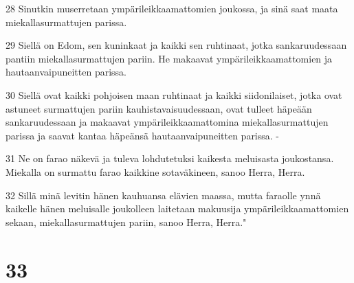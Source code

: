 \par 28 Sinutkin muserretaan ympärileikkaamattomien joukossa, ja sinä saat maata miekallasurmattujen parissa.
\par 29 Siellä on Edom, sen kuninkaat ja kaikki sen ruhtinaat, jotka sankaruudessaan pantiin miekallasurmattujen pariin. He makaavat ympärileikkaamattomien ja hautaanvaipuneitten parissa.
\par 30 Siellä ovat kaikki pohjoisen maan ruhtinaat ja kaikki siidonilaiset, jotka ovat astuneet surmattujen pariin kauhistavaisuudessaan, ovat tulleet häpeään sankaruudessaan ja makaavat ympärileikkaamattomina miekallasurmattujen parissa ja saavat kantaa häpeänsä hautaanvaipuneitten parissa. -
\par 31 Ne on farao näkevä ja tuleva lohdutetuksi kaikesta meluisasta joukostansa. Miekalla on surmattu farao kaikkine sotaväkineen, sanoo Herra, Herra.
\par 32 Sillä minä levitin hänen kauhuansa elävien maassa, mutta faraolle ynnä kaikelle hänen meluisalle joukolleen laitetaan makuusija ympärileikkaamattomien sekaan, miekallasurmattujen pariin, sanoo Herra, Herra."

\chapter{33}

